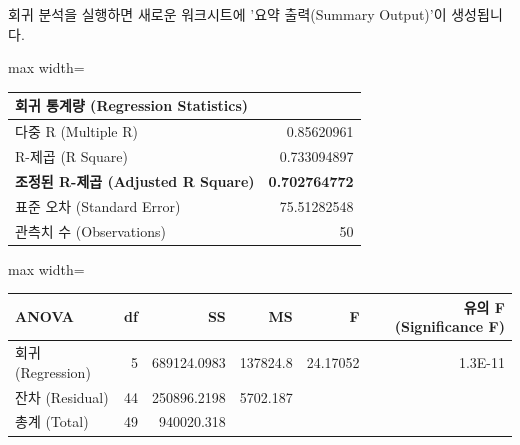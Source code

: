 \documentclass[11pt,a4paper]{article}
\begin{document}
\begin{tcolorbox}[title=\textbf{초기 Excel 출력 결과 해석}]
회귀 분석을 실행하면 새로운 워크시트에 '요약 출력(Summary Output)'이 생성됩니다.

\begin{adjustbox}{max width=\textwidth}
\begin{tabular}{l r}
\toprule
\textbf{회귀 통계량 (Regression Statistics)} & \\
\midrule
다중 R (Multiple R) & 0.85620961 \\
R-제곱 (R Square) & 0.733094897 \\
\textbf{조정된 R-제곱 (Adjusted R Square)} & \textbf{0.702764772} \\
표준 오차 (Standard Error) & 75.51282548 \\
관측치 수 (Observations) & 50 \\
\bottomrule
\end{tabular}
\end{adjustbox}

\vspace{0.5em}

\begin{adjustbox}{max width=\textwidth}
\begin{tabular}{l r r r r r}
\toprule
\textbf{ANOVA} & \textbf{df} & \textbf{SS} & \textbf{MS} & \textbf{F} & \textbf{유의 F (Significance F)} \\
\midrule
회귀 (Regression) & 5 & 689124.0983 & 137824.8 & 24.17052 & 1.3E-11 \\
잔차 (Residual) & 44 & 250896.2198 & 5702.187 & & \\
총계 (Total) & 49 & 940020.318 & & & \\
\bottomrule
\end{tabular}
\end{adjustbox}

\vspace{0.5em}


\end{tcolorbox}
\end{document}

